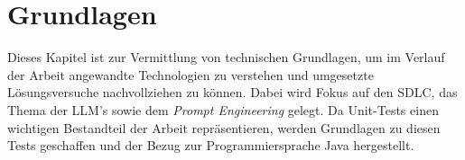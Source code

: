 
\chapter{Grundlagen}
Dieses Kapitel ist zur Vermittlung von technischen Grundlagen, um im Verlauf der Arbeit angewandte Technologien zu verstehen und umgesetzte Lösungsversuche nachvollziehen zu können. Dabei wird Fokus auf den SDLC, das Thema der LLM's sowie dem \textit{Prompt Engineering} gelegt. Da Unit-Tests einen wichtigen Bestandteil der Arbeit repräsentieren, werden Grundlagen zu diesen Tests geschaffen und der Bezug zur Programmiersprache Java hergestellt.

